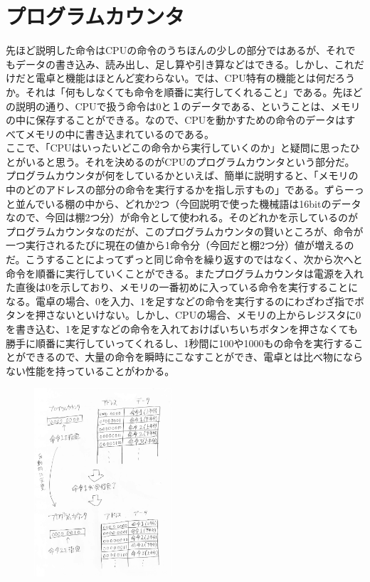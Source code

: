 \section{プログラムカウンタ}
先ほど説明した命令はCPUの命令のうちほんの少しの部分ではあるが、それでもデータの書き込み、読み出し、足し算や引き算などはできる。しかし、これだけだと電卓と機能はほとんど変わらない。では、CPU特有の機能とは何だろうか。それは「何もしなくても命令を順番に実行してくれること」である。先ほどの説明の通り、CPUで扱う命令は0と１のデータである、ということは、メモリの中に保存することができる。なので、CPUを動かすための命令のデータはすべてメモリの中に書き込まれているのである。\\
ここで、「CPUはいったいどこの命令から実行していくのか」と疑問に思ったひとがいると思う。それを決めるのがCPUのプログラムカウンタという部分だ。プログラムカウンタが何をしているかといえば、簡単に説明すると、「メモリの中のどのアドレスの部分の命令を実行するかを指し示すもの」である。ずらーっと並んでいる棚の中から、どれか2つ（今回説明で使った機械語は16bitのデータなので、今回は棚2つ分）が命令として使われる。そのどれかを示しているのがプログラムカウンタなのだが、このプログラムカウンタの賢いところが、命令が一つ実行されるたびに現在の値から1命令分（今回だと棚2つ分）値が増えるのだ。こうすることによってずっと同じ命令を繰り返すのではなく、次から次へと命令を順番に実行していくことができる。またプログラムカウンタは電源を入れた直後は0を示しており、メモリの一番初めに入っている命令を実行することになる。電卓の場合、0を入力、1を足すなどの命令を実行するのにわざわざ指でボタンを押さないといけない。しかし、CPUの場合、メモリの上からレジスタに0を書き込む、1を足すなどの命令を入れておけばいちいちボタンを押さなくても勝手に順番に実行していってくれるし、1秒間に100や1000もの命令を実行することができるので、大量の命令を瞬時にこなすことができ、電卓とは比べ物にならない性能を持っていることがわかる。\\
\begin{figure}[H]
  \centering
  \includegraphics[height=7cm]{honda/image/14.jpg}
\end{figure}
